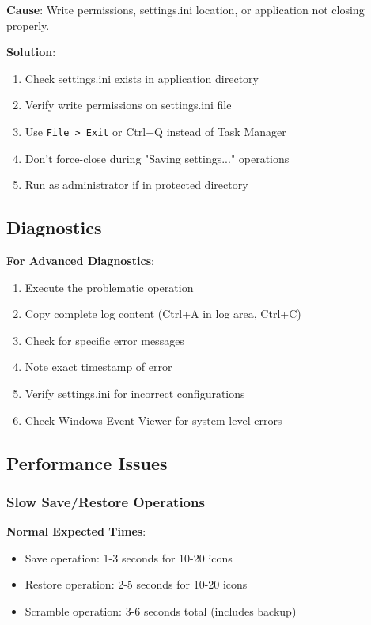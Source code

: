 \documentclass[a4paper,11pt]{article}
\begin{document}
\textbf{Cause}: Write permissions, settings.ini location, or
application not closing properly.

\textbf{Solution}:
\begin{enumerate}
  \item Check settings.ini exists in application directory
  \item Verify write permissions on settings.ini file
  \item Use \texttt{File > Exit} or Ctrl+Q instead of Task Manager
  \item Don't force-close during "Saving settings..." operations
  \item Run as administrator if in protected directory
\end{enumerate}

\subsection{Diagnostics}

\textbf{For Advanced Diagnostics}:
\begin{enumerate}
  \item Execute the problematic operation
  \item Copy complete log content (Ctrl+A in log area, Ctrl+C)
  \item Check for specific error messages
  \item Note exact timestamp of error
  \item Verify settings.ini for incorrect configurations
  \item Check Windows Event Viewer for system-level errors
\end{enumerate}

\subsection{Performance Issues}

\subsubsection{Slow Save/Restore Operations}

\textbf{Normal Expected Times}:
\begin{itemize}
  \item Save operation: 1-3 seconds for 10-20 icons
  \item Restore operation: 2-5 seconds for 10-20 icons
  \item Scramble operation: 3-6 seconds total (includes backup)
\end{itemize}
\end{document}
